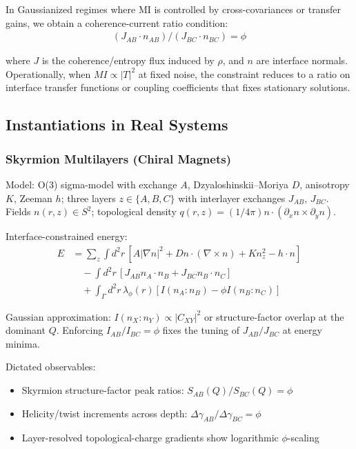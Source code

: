 \documentclass[11pt]{article}
\theoremstyle{definition}
\newcommand{\goldenratio}{\phi}
\newcommand{\density}{\rho}
\begin{document}
In Gaussianized regimes where MI is controlled by cross-covariances or transfer gains, we obtain a coherence-current ratio condition:
\begin{align}
(J_{AB} \cdot n_{AB}) / (J_{BC} \cdot n_{BC}) = \goldenratio
\end{align}

where $J$ is the coherence/entropy flux induced by $\density$, and $n$ are interface normals. Operationally, when $MI \propto |T|^2$ at fixed noise, the constraint reduces to a ratio on interface transfer functions or coupling coefficients that fixes stationary solutions.

\subsection{Instantiations in Real Systems}

\subsubsection{Skyrmion Multilayers (Chiral Magnets)}

Model: O(3) sigma-model with exchange $A$, Dzyaloshinskii–Moriya $D$, anisotropy $K$, Zeeman $h$; three layers $z \in \{A,B,C\}$ with interlayer exchanges $J_{AB}$, $J_{BC}$. Fields $n(r,z) \in S^2$; topological density $q(r,z) = (1/4\pi) n \cdot (\partial_x n \times \partial_y n)$.

Interface-constrained energy:
\begin{align}
E &= \sum_z \int d^2r \, [A|\nabla n|^2 + D n \cdot (\nabla \times n) + K n_z^2 - h \cdot n] \\
&\quad - \int d^2r \, [J_{AB} n_A \cdot n_B + J_{BC} n_B \cdot n_C] \\
&\quad + \int_\Gamma d^2r \, \lambda_\goldenratio(r) [I(n_A:n_B) - \goldenratio I(n_B:n_C)]
\end{align}

Gaussian approximation: $I(n_X:n_Y) \propto |C_{XY}|^2$ or structure-factor overlap at the dominant $Q$. Enforcing $I_{AB}/I_{BC} = \goldenratio$ fixes the tuning of $J_{AB}/J_{BC}$ at energy minima.

Dictated observables:
\begin{itemize}
\item Skyrmion structure-factor peak ratios: $S_{AB}(Q)/S_{BC}(Q) = \goldenratio$
\item Helicity/twist increments across depth: $\Delta\gamma_{AB}/\Delta\gamma_{BC} = \goldenratio$
\item Layer-resolved topological-charge gradients show logarithmic $\goldenratio$-scaling
\end{itemize}
\end{document}
